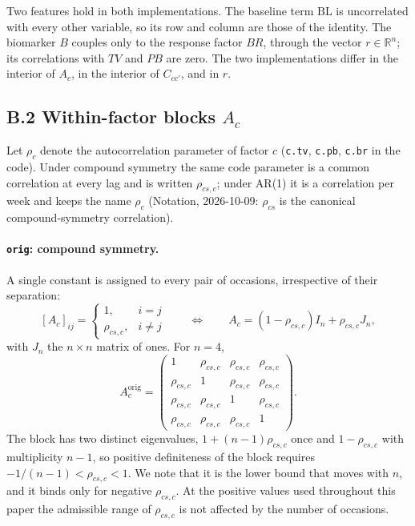 \documentclass[
  11pt,
]{article}
\begin{document}
Two features hold in both implementations. The baseline term \(\mathrm{BL}\) is
uncorrelated with every other variable, so its row and column are
those of the identity. The biomarker \(B\) couples only to the
response factor \(BR\), through the vector \(r \in \mathbb{R}^{n}\); its
correlations with \(TV\) and \(PB\) are zero. The two implementations
differ in the interior of \(A_c\), in the interior of \(C_{cc'}\), and in
\(r\).

\subsection{B.2 Within-factor blocks $A_c$}

Let \(\rho_c\) denote the autocorrelation parameter of factor \(c\)
(\texttt{c.tv}, \texttt{c.pb}, \texttt{c.br} in the code). Under
compound symmetry the same code parameter is a common correlation
at every lag and is written \(\rho_{cs,c}\); under AR(1) it is a
correlation per week and keeps the name \(\rho_c\) (Notation,
2026-10-09: \(\rho_{cs}\) is the canonical compound-symmetry
correlation).

\paragraph{\texttt{orig}: compound symmetry.}

A single constant is assigned to every pair of occasions, irrespective
of their separation:
\[
[A_c]_{ij} =
\begin{cases}
1, & i = j\\
\rho_{cs,c}, & i \neq j
\end{cases}
\qquad\Longleftrightarrow\qquad
A_c = (1-\rho_{cs,c}) I_n + \rho_{cs,c} J_n ,
\]
with \(J_n\) the \(n \times n\) matrix of ones. For \(n = 4\),
\[
A_c^{\text{orig}} =
\begin{pmatrix}
1 & \rho_{cs,c} & \rho_{cs,c} & \rho_{cs,c}\\
\rho_{cs,c} & 1 & \rho_{cs,c} & \rho_{cs,c}\\
\rho_{cs,c} & \rho_{cs,c} & 1 & \rho_{cs,c}\\
\rho_{cs,c} & \rho_{cs,c} & \rho_{cs,c} & 1
\end{pmatrix}.
\]
The block has two distinct eigenvalues, \(1 + (n-1)\rho_{cs,c}\) once and
\(1 - \rho_{cs,c}\) with multiplicity \(n-1\), so positive definiteness of the
block requires \(-1/(n-1) < \rho_{cs,c} < 1\). We note that it is the lower
bound that moves with \(n\), and it binds only for negative \(\rho_{cs,c}\).
At the positive values used throughout this paper the admissible
range of \(\rho_{cs,c}\) is not affected by the number of occasions.
\end{document}
